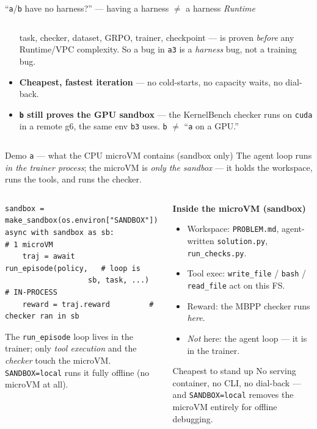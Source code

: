 \documentclass[aspectratio=169]{beamer}
\begin{document}
\begin{frame}{``\texttt{a}/\texttt{b} have no harness?'' --- having a harness $\neq$ a harness \emph{Runtime}}
\begin{columns}[T]
\begin{column}{0.5\textwidth}
\begin{itemize}
          task, checker, dataset, GRPO, trainer, checkpoint --- is proven \emph{before} any
          Runtime/VPC complexity. So a bug in \texttt{a3} is a \emph{harness} bug, not a training bug.
        \item \textbf{Cheapest, fastest iteration} --- no cold-starts, no capacity waits, no dial-back.
        \item \textbf{\texttt{b} still proves the GPU sandbox} --- the KernelBench checker runs on
          \texttt{cuda} in a remote g6, the same env \texttt{b3} uses. \texttt{b} $\neq$ ``\texttt{a} on a GPU.''
      \end{itemize}
    \end{column}
  \end{columns}
\end{frame}

\begin{frame}[fragile]{Demo \texttt{a} --- what the CPU microVM contains (sandbox only)}
  \footnotesize The agent loop runs \emph{in the trainer process}; the microVM is \emph{only the
  sandbox} --- it holds the workspace, runs the tools, and runs the checker.
  \begin{columns}[T]
    \begin{column}{0.56\textwidth}
{\scriptsize
\begin{verbatim}
sandbox = make_sandbox(os.environ["SANDBOX"])
async with sandbox as sb:              # 1 microVM
    traj = await run_episode(policy,   # loop is
                   sb, task, ...)      # IN-PROCESS
    reward = traj.reward         # checker ran in sb
\end{verbatim}}
      \scriptsize The \texttt{run\_episode} loop lives in the trainer; only \emph{tool execution} and the
      \emph{checker} touch the microVM. \texttt{SANDBOX=local} runs it fully offline (no microVM at all).
    \end{column}
    \begin{column}{0.44\textwidth}
      \footnotesize\textbf{Inside the microVM (sandbox)}
      \begin{itemize}\setlength\itemsep{0.08em}
        \item Workspace: \texttt{PROBLEM.md}, agent-written \texttt{solution.py}, \texttt{run\_checks.py}.
        \item Tool exec: \texttt{write\_file} / \texttt{bash} / \texttt{read\_file} act on this FS.
        \item Reward: the MBPP checker runs \emph{here}.
        \item \emph{Not} here: the agent loop --- it is in the trainer.
      \end{itemize}
      \begin{block}{Cheapest to stand up}
        \scriptsize No serving container, no CLI, no dial-back --- and \texttt{SANDBOX=local}
        removes the microVM entirely for offline debugging.
      \end{block}
    \end{column}
  \end{columns}
\end{frame}
\end{document}
